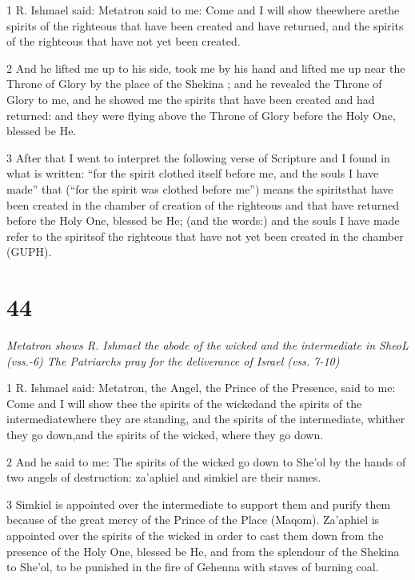 \par 1 R. Ishmael said: Metatron said to me: Come and I will show theewhere arethe spirits of the righteous that have been created and have returned, and the spirits of the righteous that have not yet been created. 

\par 2 And he lifted me up to his side, took me by his hand and lifted me up near the Throne of Glory by the place of the Shekina ; and he revealed the Throne of Glory to me, and he showed me the spirits that have been created and had returned: and they were flying above the Throne of Glory before the Holy One, blessed be He. 

\par 3 After that I went to interpret the following verse of Scripture and I found in what is written: “for the spirit clothed itself before me, and the souls I have made” that (“for the spirit was clothed before me”) means the spiritsthat have been created in the chamber of creation of the righteous and that have returned before the Holy One, blessed be He; (and the words:) and the souls I have made refer to the spiritsof the righteous that have not yet been created in the chamber (GUPH). 


\chapter{44}

\par \textit{Metatron shows R. Ishmael the abode of the wicked and the intermediate in SheoL (vss.-6) The Patriarchs pray for the deliverance of Israel (vss. 7-10)}

\par 1 R. Ishmael said: Metatron, the Angel, the Prince of the Presence, said to me: Come and I will show thee the spirits of the wickedand the spirits of the intermediatewhere they are standing, and the spirits of the intermediate, whither they go down,and the spirits of the wicked, where they go down. 

\par 2 And he said to me: The spirits of the wicked go down to She'ol by the hands of two angels of destruction: za'aphiel and simkiel are their names. 

\par 3 Simkiel is appointed over the intermediate to support them and purify them because of the great mercy of the Prince of the Place (Maqom). Za'aphiel is appointed over the spirits of the wicked in order to cast them down from the presence of the Holy One, blessed be He, and from the splendour of the Shekina to She'ol, to be punished in the fire of Gehenna with staves of burning coal. 

